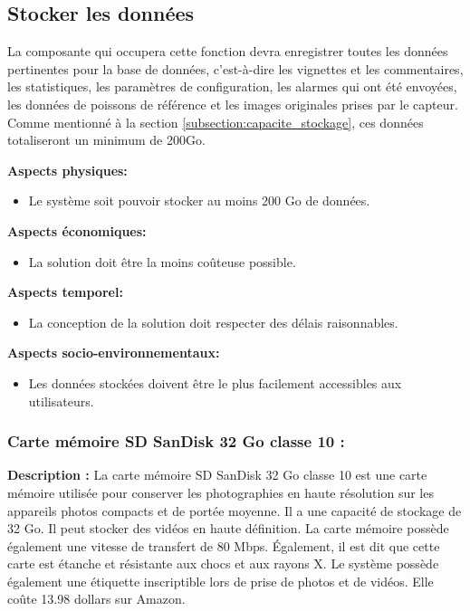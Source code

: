 \subsection{Stocker les données}
La composante qui occupera cette fonction devra enregistrer toutes les données pertinentes pour la base de données, c'est-à-dire les vignettes et les commentaires, les statistiques, les paramètres de configuration, les alarmes  qui ont été envoyées, les données de poissons de référence et les images originales prises par le capteur.
Comme mentionné à la section \ref{subsection:capacite_stockage}, ces données totaliseront un minimum de 200Go.

\textbf{Aspects physiques:}
\begin{itemize} [label = {--}]
    \item Le système soit pouvoir stocker au moins 200 Go de données.
\end{itemize}

\textbf{Aspects économiques:}
\begin{itemize} [label = {--}]
    \item La solution doit être la moins coûteuse possible.
\end{itemize}

\textbf{Aspects temporel:}
\begin{itemize} [label = {--}]
    \item La conception de la solution doit respecter des délais raisonnables.
\end{itemize}

\textbf{Aspects socio-environnementaux:}
\begin{itemize} [label = {--}]
    \item Les données stockées doivent être le plus facilement accessibles aux utilisateurs.
\end{itemize}

\subsubsection{Carte mémoire SD SanDisk 32 Go classe 10 :}

\textbf{Description :} La carte mémoire SD SanDisk 32 Go classe 10 est une carte mémoire utilisée pour conserver les photographies en haute résolution sur les appareils photos compacts et de portée moyenne. Il a une capacité de stockage de 32 Go. Il peut stocker des vidéos en haute définition. La carte mémoire possède également une vitesse de transfert de 80 Mbps. Également, il est dit que cette carte est étanche et résistante aux chocs et aux rayons X. Le système possède également une étiquette inscriptible lors de prise de photos et de vidéos. Elle coûte 13.98 dollars sur Amazon.

